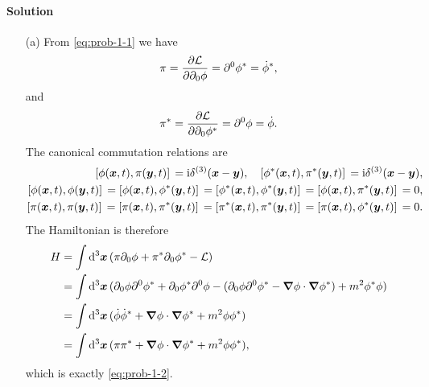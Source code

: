 \documentclass[hyperref, a4paper]{article}
\newcommand*{\ii}{\mathrm{i}}
\begin{document}
\paragraph{Solution}
\begin{itemize}
    \item[(a)]  From \eqref{eq:prob-1-1} we have 
    \begin{equation}
        \pi = \pdv{\mathcal{L}}{\partial_0 \phi} = \partial^0 \phi^* = \dot{\phi}^*,
    \end{equation}
    and
    \begin{equation}
        \pi^* = \pdv{\mathcal{L}}{\partial_0 \phi^*} = \partial^0 \phi = \dot{\phi}.
    \end{equation}
    The canonical commutation relations are 
    \begin{equation}
        \begin{aligned}
            \comm*{\phi(\vb*{x}, t)}{\pi(\vb*{y}, t)} = \ii \delta^{(3)}(\vb*{x} - \vb*{y}), \quad \comm*{\phi^*(\vb*{x}, t)}{\pi^*(\vb*{y}, t)} = \ii \delta^{(3)}(\vb*{x} - \vb*{y}), \\
            \comm*{\phi(\vb*{x}, t)}{\phi(\vb*{y}, t)} = \comm*{\phi(\vb*{x}, t)}{\phi^*(\vb*{y}, t)} = \comm*{\phi^*(\vb*{x}, t)}{\phi^*(\vb*{y}, t)} = \comm*{\phi(\vb*{x}, t)}{\pi^*(\vb*{y}, t)} = 0, \\
            \comm*{\pi(\vb*{x}, t)}{\pi(\vb*{y}, t)} = \comm*{\pi(\vb*{x}, t)}{\pi^*(\vb*{y}, t)} = \comm*{\pi^*(\vb*{x}, t)}{\pi^*(\vb*{y}, t)} = \comm*{\pi(\vb*{x}, t)}{\phi^*(\vb*{y}, t)} = 0.
        \end{aligned}
        \label{eq:canonical-relation}
    \end{equation}
    The Hamiltonian is therefore 
    \[
        \begin{aligned}
            H &= \int \dd[3]{\vb*{x}} (\pi \partial_0 \phi + \pi^* \partial_0 \phi^* - \mathcal{L}) \\
            &= \int \dd[3]{\vb*{x}} ( \partial_0 \phi \partial^0 \phi^* + \partial_0 \phi^* \partial^0 \phi - (\partial_0 \phi \partial^0 \phi^* - \grad{\phi} \cdot \grad{\phi^*}) + m^2 \phi^* \phi) \\
            &= \int \dd[3]{\vb*{x}} (\dot{\phi} \dot{\phi}^* + \grad{\phi} \cdot \grad{\phi^*} + m^2 \phi \phi^*) \\
            &= \int \dd[3]{\vb*{x}} (\pi \pi^* + \grad{\phi} \cdot \grad{\phi^*} + m^2 \phi \phi^*),
        \end{aligned}
    \]
    which is exactly \eqref{eq:prob-1-2}.


\end{itemize}
\end{document}
